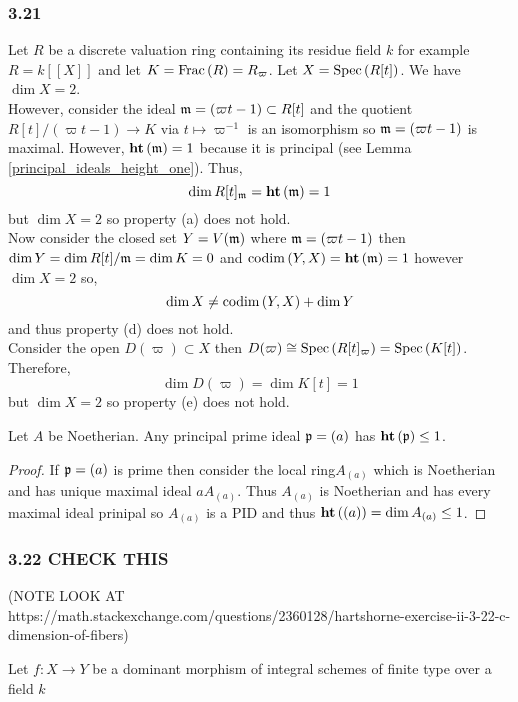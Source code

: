 \documentclass[12pt]{article}
\begin{document}
\subsubsection{3.21}

Let $R$ be a discrete valuation ring containing its residue field $k$ for example $R = k[[X]]$ and let $K = \mathrm{Frac}\left(R\right) = R_\varpi$. Let $X = \mathrm{Spec}\left( R[t] \right)$. We have $\dim{X} = 2$. 
\bigskip\\
However, consider the ideal $\mathfrak{m} = (\varpi t - 1) \subset R[t]$ and the quotient $R[t]/(\varpi t - 1) \to K$ via $t \mapsto \varpi^{-1}$ is an isomorphism so $\mathfrak{m} = (\varpi t - 1)$ is maximal. However, $\mathbf{ht}\left( \mathfrak{m} \right) = 1$ because it is principal (see Lemma \ref{principal_ideals_height_one}). Thus,
\[ \dim{R[t]_{\mathfrak{m}}} = \mathbf{ht}\left( \mathfrak{m} \right) = 1 \]
but $\dim{X} = 2$ so property (a) does not hold.
\bigskip\\
Now consider the closed set $Y = V(\mathfrak{m})$ where $\mathfrak{m} = (\varpi t - 1)$ then $\dim{Y} = \dim{R[t] / \mathfrak{m}} = \dim{K} = 0$ and $\mathrm{codim}\left( Y, X \right) = \mathbf{ht}\left( \mathfrak{m} \right) = 1$ however $\dim{X} = 2$ so,
\[ \dim{X} \neq \mathrm{codim}\left( Y, X \right) + \dim{Y} \]
and thus property (d) does not hold. 
\bigskip\\
Consider the open $D(\varpi) \subset X$ then $D(\varpi) \cong \mathrm{Spec}\left( R[t]_\varpi \right) = \mathrm{Spec}\left( K[t] \right)$. Therefore,
\[ \dim{D(\varpi)} = \dim{K[t]} = 1 \]
but $\dim{X} = 2$ so property (e) does not hold.

\begin{lemma} \label{principal_ideals_height_one}
Let $A$ be Noetherian. Any principal prime ideal $\mathfrak{p} = (a)$ has $\mathbf{ht}\left( \mathfrak{p} \right) \le 1$.
\end{lemma}

\begin{proof}
If $\mathfrak{p} = (a)$ is prime then consider the local ring$A_{(a)}$ which is Noetherian and has unique maximal ideal $a A_{(a)}$. Thus $A_{(a)}$ is Noetherian and has every maximal ideal prinipal so $A_{(a)}$ is a PID and thus $\mathbf{ht}\left( (a) \right) = \dim{A_{(a)}} \le 1$.  
\end{proof}

\subsubsection{3.22 CHECK THIS}

(NOTE LOOK AT https://math.stackexchange.com/questions/2360128/hartshorne-exercise-ii-3-22-c-dimension-of-fibers)

Let $f : X \to Y$ be a dominant morphism of integral schemes of finite type over a field $k$
\end{document}
